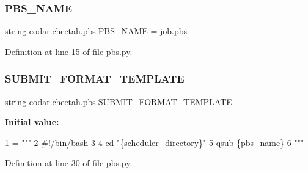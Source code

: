 \subsubsection{\texorpdfstring{P\+B\+S\+\_\+\+N\+A\+ME}{PBS\_NAME}}
{\footnotesize\ttfamily string codar.\+cheetah.\+pbs.\+P\+B\+S\+\_\+\+N\+A\+ME = \textquotesingle{}job.\+pbs\textquotesingle{}}



Definition at line 15 of file pbs.\+py.

\mbox{\label{namespacecodar_1_1cheetah_1_1pbs_af0456cd6c62ec9db8b9fdfafc248b940}} 
\subsubsection{\texorpdfstring{S\+U\+B\+M\+I\+T\+\_\+\+F\+O\+R\+M\+A\+T\+\_\+\+T\+E\+M\+P\+L\+A\+TE}{SUBMIT\_FORMAT\_TEMPLATE}}
{\footnotesize\ttfamily string codar.\+cheetah.\+pbs.\+S\+U\+B\+M\+I\+T\+\_\+\+F\+O\+R\+M\+A\+T\+\_\+\+T\+E\+M\+P\+L\+A\+TE}

{\bfseries Initial value\+:}
\begin{DoxyCode}
1 =  \textcolor{stringliteral}{"""}
2 \textcolor{stringliteral}{#!/bin/bash}
3 \textcolor{stringliteral}{}
4 \textcolor{stringliteral}{cd "\{scheduler\_directory\}"}
5 \textcolor{stringliteral}{qsub \{pbs\_name\}}
6 \textcolor{stringliteral}{"""}
\end{DoxyCode}


Definition at line 30 of file pbs.\+py.

